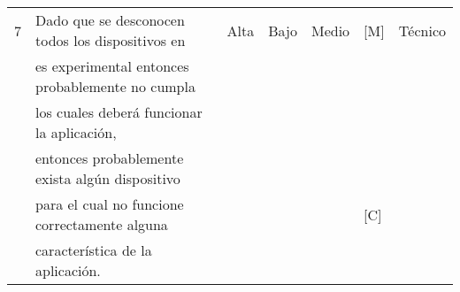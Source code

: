 \begin{landscape}
\begin{table}
\begin{tabular}{| l | l | l | l | l | l | l | }
7 & Dado que se desconocen todos los dispositivos en  & Alta & Bajo & Medio & [M]  & Técnico\\
  & es experimental entonces probablemente no cumpla  & & & &		 & \\
  & los cuales deberá funcionar la aplicación,  & & & &		 & \\
  & entonces probablemente exista algún dispositivo	  & & & & 		 & \\ 
  & para el cual no funcione correctamente alguna &&&				&[C] & \\
  & característica de la aplicación. &&&							& & \\ \hline

     \hline
\end{tabular}
\end{table}
\end{landscape}


